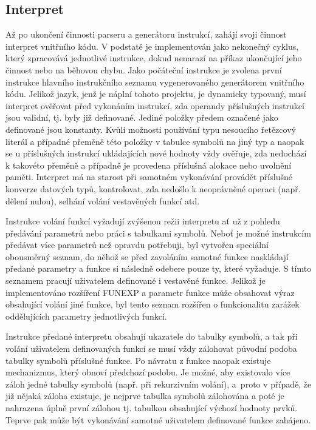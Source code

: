 \documentclass[12pt,a4paper,titlepage,final]{article}
\begin{document}
\subsection{Interpret}
Až po ukončení činnosti parseru a generátoru instrukcí, zahájí svoji činnost 
interpret vnitřního kódu. V podstatě je implementován jako nekonečný cyklus, 
který zpracovává jednotlivé instrukce, dokud nenarazí na příkaz ukončující 
jeho činnost nebo na běhovou chybu. Jako po\-čá\-teč\-ní instrukce je zvolena
první instrukce hlavního instrukčního seznamu vygenerovaného generátorem 
vnitřního kódu. Jelikož jazyk, jenž je náplní tohoto projektu, je dynamicky 
typovaný, musí interpret ověřovat před vykonáním instrukcí, zda operandy 
příslušných instrukcí jsou validní, tj. byly již definované. Jediné položky 
předem označené jako definované jsou konstanty. Kvůli možnosti používání typu 
nesoucího řetězcový literál a případné přeměně této položky v tabulce symbolů 
na jiný typ a naopak se u příslušných instrukcí ukládajících nové hodnoty 
vždy ověřuje, zda nedochází k takovéto přeměně a případně je provedena 
příslušná alokace nebo uvolnění paměti. Interpret má na starost při samotném 
vykonávání provádět příslušné konverze datových typů, kontrolovat, zda 
nedošlo k neoprávněné operaci (např. dělení nulou), selhání volání 
vestavěných funkcí atd. 

Instrukce volání funkcí vyžadují zvýšenou režii interpretu ať už z pohledu 
předávání parametrů nebo práci s tabulkami symbolů. Neboť je možné instrukcím 
předávat více parametrů než opravdu potřebuji, byl vytvořen speciální 
obousměrný seznam, do něhož se před zavoláním samotné funkce naskládají 
předané parametry a funkce si následně odebere pouze ty, které vyžaduje. 
S tímto seznamem pracují uživatelem definované i vestavěné funkce. Jelikož je 
implementováno rozšíření FUNEXP a parametr funkce může obsahovat výraz 
obsahující volání jiné funkce, byl tento seznam rozšířen o funkcionalitu 
zarážek oddělujících parametry jednotlivých funkcí.

Instrukce předané interpretu obsahují ukazatele do tabulky symbolů, a tak 
při volání uživate\-lem definovaných funkcí se musí vždy zálohovat původní 
podoba tabulky symbolů příslušné funkce. Po návratu z funkce naopak existuje 
mechanizmus, který obnoví předchozí podobu. Je možné, aby existovalo více 
záloh jedné tabulky symbolů (např. při rekurzivním volání), a~proto v případě, 
že již nějaká záloha existuje, je nejprve tabulka symbolů zálohována a poté 
je nahrazena úplně první zálohou tj. tabulkou obsahující výchozí hodnoty prvků.
Teprve pak může být vykonávání samotné uživatelem definované funkce zahájeno.
\end{document}
